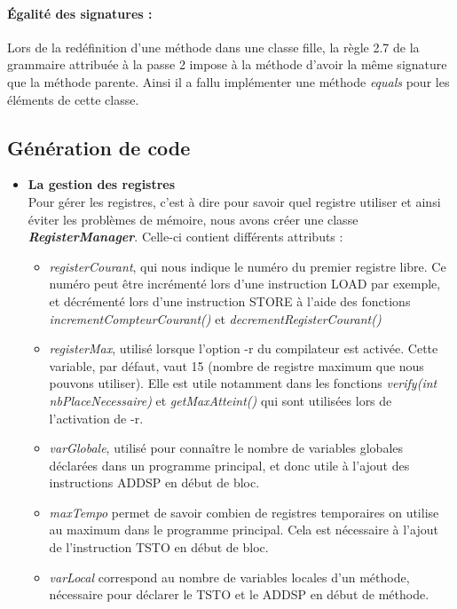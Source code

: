 \documentclass{article}
\begin{document}
    \paragraph{Égalité des signatures :} Lors de la redéfinition d'une méthode dans une classe fille, la règle 2.7 de la grammaire attribuée à la passe 2 impose à la méthode d'avoir la même signature que la méthode parente. Ainsi il a fallu implémenter une méthode \textit{equals} pour les éléments de cette classe.




\subsection{Génération de code}
\begin{itemize}
\item \textbf{La gestion des registres} \newline
\\
Pour gérer les registres, c'est à dire pour savoir quel registre utiliser et ainsi éviter
les problèmes de mémoire,  nous avons créer une classe \textit{\textbf{RegisterManager}}. Celle-ci contient différents attributs :
\begin{itemize}
\item \textit{registerCourant}, qui nous indique le numéro du premier registre libre. Ce numéro peut être incrémenté lors d'une
instruction LOAD par exemple, et décrémenté lors d'une instruction STORE à l'aide des fonctions \textit{incrementCompteurCourant()} et \textit{decrementRegisterCourant()}

\item \textit{registerMax}, utilisé lorsque l'option -r du compilateur est activée. Cette variable, par défaut, vaut 15 (nombre de registre maximum que nous pouvons utiliser). 
Elle est utile notamment dans les fonctions \textit{verify(int nbPlaceNecessaire)} et \textit{getMaxAtteint()} qui sont utilisées lors de l'activation de -r.

\item \textit{varGlobale}, utilisé pour connaître le nombre de variables globales déclarées dans un programme principal, et donc utile à l'ajout des instructions ADDSP en début de bloc.

\item \textit{maxTempo} permet de savoir combien de registres temporaires on utilise au maximum dans le programme principal. 
Cela est nécessaire à l'ajout de l'instruction TSTO en début de bloc.

\item \textit{varLocal} correspond au nombre de variables locales d'un méthode, nécessaire pour déclarer le TSTO et le ADDSP en début de méthode.
\end{itemize}


\end{itemize}
\end{document}
